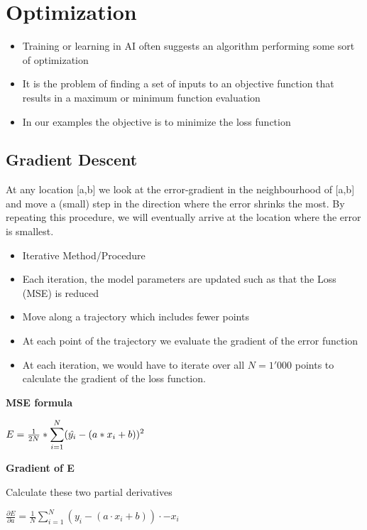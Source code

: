 \section{Optimization}
\begin{itemize}
    \item Training or learning in AI often suggests an algorithm performing some sort of optimization
    \item It is the problem of finding a set of inputs to an objective function that results in a maximum or minimum function evaluation
    \item In our examples the objective is to minimize the loss function
\end{itemize}

\subsection{Gradient Descent}
At any location [a,b] we look at the error-gradient in the neighbourhood of [a,b] and move a (small) step in the direction where the error shrinks the most.
By repeating this procedure, we will eventually arrive at the location where the error is smallest.

\begin{itemize}
    \item Iterative Method/Procedure
    \item Each iteration, the model parameters are updated such as that the Loss (MSE) is reduced
    \item Move along a trajectory which includes fewer points
    \item At each point of the trajectory we evaluate the gradient of the error function
    \item At each iteration, we would have to iterate over all $N = 1'000$ points to calculate the gradient of the loss function.
\end{itemize}

\textbf{MSE formula}
\begin{center}
    $E = \frac{1}{2N} * \large\displaystyle\sum_{i = 1}^{N}(\hat{y_i} - (a*x_i + b))^2$
\end{center}

\textbf{Gradient of E}

Calculate these two partial derivatives

\begin{center}
    $\frac{\partial E}{\partial a} = \frac{1}{N}\sum_{i=1}^N (y_i - (a \cdot x_i + b)) \cdot -x_i$
\end{center}

